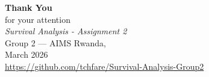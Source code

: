 \documentclass[aspectratio=169, 10pt]{beamer}
\begin{document}
\begin{frame}
  \begin{center}
  	\large
    \vspace{18pt}
    {\Large\color{primary}\textbf{Thank You}}\\[8pt]
    \large for your attention\\[20pt]
    \normalsize\textit{Survival Analysis - Assignment 2}\\[4pt]
    Group 2 --- AIMS Rwanda, \\
    March 2026\\[10pt]
    \small\color{gray}
    \url{https://github.com/tchfare/Survival-Analysis-Group2}
  \end{center}
\end{frame}
\end{document}
